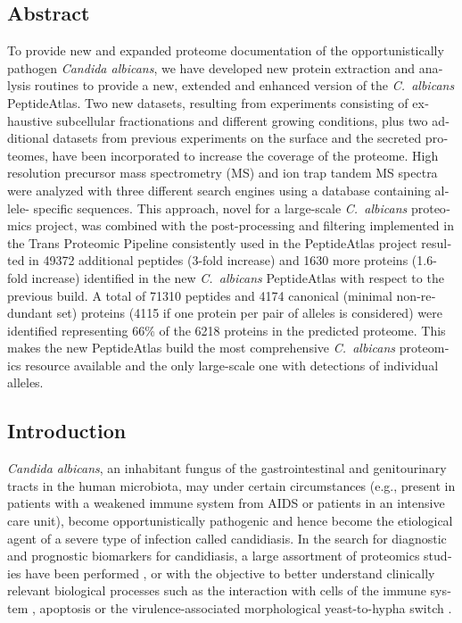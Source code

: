 \begin{otherlanguage}{british}
\newpage


\chapter*{Abstract}
To provide new and expanded proteome documentation of the opportunistically pathogen \linebreak
\textit{Candida albicans}, we have developed new protein extraction and analysis routines to
provide a new, extended and enhanced version of the \textit{\mbox{C. albicans}} PeptideAtlas. Two new
datasets, resulting from experiments consisting of exhaustive subcellular fractionations and
different growing conditions, plus two additional datasets from previous experiments on the
surface and the secreted proteomes, have been incorporated to increase the coverage of the
proteome. High resolution precursor mass spectrometry (MS) and ion trap tandem MS
spectra were analyzed with three different search engines using a database containing allele-
specific sequences. This approach, novel for a large-scale \textit{\mbox{C. albicans}} proteomics project,
was combined with the post-processing and filtering
implemented in the Trans Proteomic Pipeline consistently used in the PeptideAtlas project
resulted in 49372 additional peptides (3-fold increase) and 1630 more proteins (1.6-fold increase)
identified in the new
\textit{\mbox{C. albicans}} PeptideAtlas with respect to the previous build. A total of 71310 peptides and
4174 canonical (minimal non-redundant set) proteins (4115 if one protein per pair of alleles is
considered) were identified representing 66\% of the 6218 proteins in the predicted proteome.
This makes the new PeptideAtlas build the most comprehensive \textit{\mbox{C. albicans}} proteomics
resource available and the only large-scale one with detections of individual alleles.

\newpage

\section*{Introduction}

\textit{Candida albicans}, an inhabitant fungus of the gastrointestinal and genitourinary tracts in the
human microbiota, may under certain circumstances (e.g., present in patients with a
weakened immune system from AIDS or patients in an intensive care unit), become
opportunistically pathogenic and hence become the etiological agent of a severe type of
infection called candidiasis. In the search for diagnostic and prognostic biomarkers for
candidiasis, a large assortment of proteomics studies have been performed \citep{Pitarch2011}, or with the
objective to better understand clinically relevant biological processes such as the interaction
with cells of the immune system \citep{Fernandez-Arenas2007,Cheng2012a,Gow2011}, 
apoptosis \citep{Ramsdale2008,Hao2013c} or the virulence-associated
morphological yeast-to-hypha switch \citep{Monteoliva2010,Vialas2012}. 


\end{otherlanguage}
